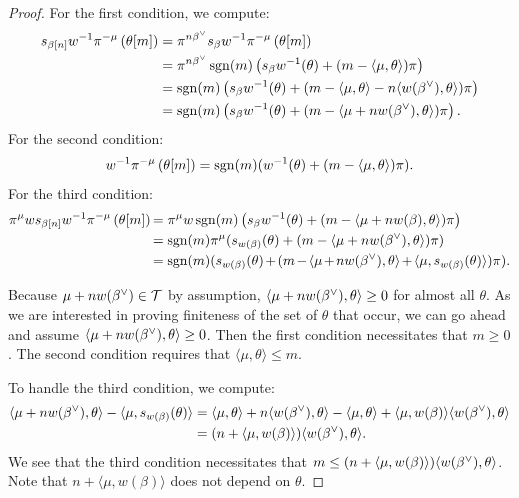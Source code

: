 \documentclass[10pt]{amsart}
\begin{document}
\begin{proof}
For the first condition, we compute:
\begin{align*}
s_{\beta[n]} w^{-1} \pi^{-\mu} \left(\theta[m] \right) &=
\pi^{n \beta^\vee} s_\beta w^{-1} \pi^{-\mu} \left(\theta[m] \right) \\
&= \pi^{n \beta^\vee} \operatorname{sgn}(m) \left(s_\beta w^{-1}(\theta) + (m - \langle \mu, \theta \rangle) \pi \right)\\
&=
\operatorname{sgn}(m) \left(s_\beta w^{-1}(\theta) + (m - \langle \mu, \theta \rangle - n \langle w(\beta^\vee),\theta \rangle) \pi \right)\\
&=
\operatorname{sgn}(m) \left(s_\beta w^{-1}(\theta) + (m - \langle \mu + n w(\beta^\vee), \theta \rangle) \pi \right).
\end{align*}
For the second condition:
\begin{equation*}
w^{-1} \pi^{-\mu} \left(\theta[m] \right) =
\operatorname{sgn}(m) (w^{-1}(\theta) + (m - \langle \mu, \theta \rangle) \pi).
\end{equation*}
For the third condition:
\begin{align*}
\pi^{\mu} w s_{\beta[n]} w^{-1} \pi^{-\mu} \left(\theta[m] \right) \mkern -2mu&=
\pi^{\mu} w
\operatorname{sgn}(m) \left(s_\beta w^{-1}(\theta) + (m - \langle \mu + n w(\beta), \theta \rangle) \pi \right)\\
&= \operatorname{sgn}(m) \pi^{\mu} (s_{w(\beta)}(\theta) + (m - \langle \mu + n w(\beta^\vee), \theta \rangle) \pi)\\
&= \operatorname{sgn}(m) (s_{w(\beta)}(\theta) \mkern -2mu + \mkern -2mu (m \mkern -2mu - \mkern -2mu\langle \mu \mkern -2mu+\mkern -2mu n w(\beta^\vee), \theta \rangle \mkern -2mu+\mkern -2mu \langle \mu, s_{w(\beta)}(\theta)\rangle) \pi).
\end{align*}

Because $\mu + n w(\beta^\vee) \in \mathcal{T}$ by assumption, $\langle \mu + n w(\beta^\vee), \theta \rangle \geq 0$ for almost all $\theta$. As we are interested in proving finiteness of the set of $\theta$ that occur, we can go ahead and assume $\langle \mu + n w(\beta^\vee), \theta \rangle \geq 0$. Then the first condition necessitates that $m \geq 0$. The second condition requires that $\langle \mu, \theta \rangle \leq m$.

To handle the third condition, we compute:
\begin{align*}
\langle \mu + n w(\beta^\vee), \theta \rangle - \langle \mu, s_{w(\beta)}(\theta)\rangle &=
\langle \mu, \theta \rangle + n \langle w(\beta^\vee), \theta \rangle - \langle \mu, \theta \rangle + \langle \mu, w(\beta) \rangle \langle w(\beta^\vee), \theta \rangle\\
&= (n + \langle \mu, w(\beta) \rangle) \langle w(\beta^\vee), \theta \rangle.
\end{align*}
We see that the third condition necessitates that $m \leq (n + \langle \mu, w(\beta) \rangle) \langle w(\beta^\vee), \theta \rangle$. Note that $n + \langle \mu, w(\beta) \rangle $ does not depend on $\theta$.


\end{proof}
\end{document}
